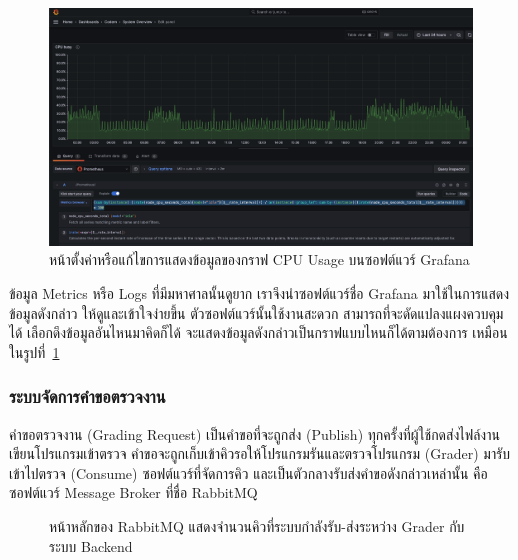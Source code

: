 \documentclass[12pt,one side,openright,a4paper]{cpe-thesis-th}
\newcommand{\thaijustify}[1]{%
  \par\hspace{30pt}\justifying
  #1
}
\begin{document}
            \begin{figure}[H]
                \centering
                \includegraphics[width=12cm]{figure/results/grafana-edit.png}
                \caption[การนิยามและสร้างกราฟในซอฟต์แวร์ Grafana]{หน้าตั้งค่าหรือแก้ไขการแสดงข้อมูลของกราฟ CPU Usage บนซอฟต์แวร์ Grafana}
                \label{fig:res-grafana-edit}
            \end{figure}
            \thaijustify{
                ข้อมูล Metrics หรือ Logs ที่มีมหาศาลนั้นดูยาก เราจึงนำซอฟต์แวร์ชื่อ Grafana มาใช้ในการแสดงข้อมูลดังกล่าว ให้ดูและเข้าใจง่ายขึ้น ตัวซอฟต์แวร์นั้นใช้งานสะดวก สามารถที่จะดัดแปลงแผงควบคุมได้ เลือกดึงข้อมูลอันไหนมาคิดก็ได้ จะแสดงข้อมูลดังกล่าวเป็นกราฟแบบไหนก็ได้ตามต้องการ เหมือนในรูปที่~\ref{fig:res-grafana-edit}
            }
        \subsubsection{ระบบจัดการคำขอตรวจงาน}
            \thaijustify{
                คำขอตรวจงาน (Grading Request) เป็นคำขอที่จะถูกส่ง (Publish) ทุกครั้งที่ผู้ใช้กดส่งไฟล์งานเขียนโปรแกรมเข้าตรวจ คำขอจะถูกเก็บเข้าคิวรอให้โปรแกรมรันและตรวจโปรแกรม (Grader) มารับเข้าไปตรวจ (Consume) ซอฟต์แวร์ที่จัดการคิว และเป็นตัวกลางรับส่งคำขอดังกล่าวเหล่านั้น คือซอฟต์แวร์ Message Broker ที่ชื่อ RabbitMQ
            }
            \begin{figure}[H]
                \centering
                \caption[หน้าหลักของ RabbitMQ]{หน้าหลักของ RabbitMQ แสดงจำนวนคิวที่ระบบกำลังรับ-ส่งระหว่าง Grader กับระบบ Backend}
                \label{fig:res-rabbitmq}
            \end{figure}
\end{document}
